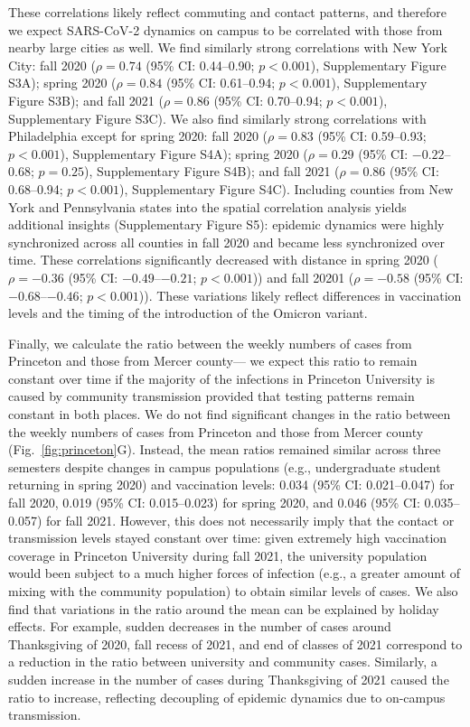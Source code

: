 \documentclass[12pt]{article}
\newcommand{\fref}[1]{Fig.~\ref{fig:#1}}
\begin{document}
These correlations likely reflect commuting and contact patterns, and therefore we expect SARS-CoV-2 dynamics on campus to be correlated with those from nearby large cities as well. 
We find similarly strong correlations with New York City: fall 2020 ($\rho = 0.74$ (95\% CI: 0.44--0.90; $p < 0.001$), Supplementary Figure S3A); spring 2020 ($\rho = 0.84$ (95\% CI: 0.61--0.94; $p < 0.001$), Supplementary Figure S3B); and fall 2021 ($\rho = 0.86$ (95\% CI: 0.70--0.94; $p < 0.001$), Supplementary Figure S3C).
We also find similarly strong correlations with Philadelphia except for spring 2020: fall 2020 ($\rho = 0.83$ (95\% CI: 0.59--0.93; $p < 0.001$), Supplementary Figure S4A); spring 2020 ($\rho = 0.29$ (95\% CI: $-0.22$--0.68; $p = 0.25$), Supplementary Figure S4B); and fall 2021 ($\rho = 0.86$ (95\% CI: 0.68--0.94; $p < 0.001$), Supplementary Figure S4C).
Including counties from New York and Pennsylvania states into the spatial correlation analysis yields additional insights (Supplementary Figure S5):
epidemic dynamics were highly synchronized across all counties in fall 2020 and became less synchronized over time. 
These correlations significantly decreased with distance in spring 2020 ($\rho = -0.36$ (95\% CI: $-0.49$--$-0.21$; $p < 0.001$)) and fall 20201 ($\rho = -0.58$ (95\% CI: $-0.68$--$-0.46$; $p < 0.001$)).
These variations likely reflect differences in vaccination levels and the timing of the introduction of the Omicron variant.

Finally, we calculate the ratio between the weekly numbers of cases from Princeton and those from Mercer county---
we expect this ratio to remain constant over time if the majority of the infections in Princeton University is caused by community transmission provided that testing patterns remain constant in both places.
We do not find significant changes in the ratio between the weekly numbers of cases from Princeton and those from Mercer county (\fref{princeton}G).
Instead, the mean ratios remained similar across three semesters despite changes in campus populations (e.g., undergraduate student returning in spring 2020) and vaccination levels: 0.034 (95\% CI: 0.021--0.047) for fall 2020, 0.019 (95\% CI: 0.015--0.023) for spring 2020, and 0.046 (95\% CI: 0.035--0.057) for fall 2021.
However, this does not necessarily imply that the contact or transmission levels stayed constant over time: given extremely high vaccination coverage in Princeton University during fall 2021, the university population would been subject to a much higher forces of infection (e.g., a greater amount of mixing with the community population) to obtain similar levels of cases.
We also find that variations in the ratio around the mean can be explained by holiday effects.
For example, sudden decreases in the number of cases around Thanksgiving of 2020, fall recess of 2021, and end of classes of 2021 correspond to a reduction in the ratio between university and community cases.
Similarly, a sudden increase in the number of cases during Thanksgiving of 2021 caused the ratio to increase, reflecting decoupling of epidemic dynamics due to on-campus transmission.
\end{document}

